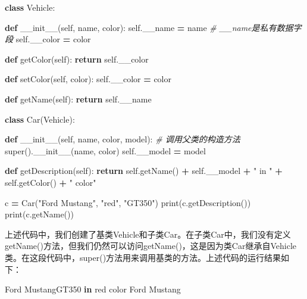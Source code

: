 \documentclass[]{ctexbook}
\newenvironment{Shaded}{\begin{snugshade}}{\end{snugshade}}
\newcommand{\BuiltInTok}[1]{#1}
\newcommand{\CommentTok}[1]{\textcolor[rgb]{0.56,0.35,0.01}{\textit{#1}}}
\newcommand{\ControlFlowTok}[1]{\textcolor[rgb]{0.13,0.29,0.53}{\textbf{#1}}}
\newcommand{\FunctionTok}[1]{\textcolor[rgb]{0.00,0.00,0.00}{#1}}
\newcommand{\KeywordTok}[1]{\textcolor[rgb]{0.13,0.29,0.53}{\textbf{#1}}}
\newcommand{\NormalTok}[1]{#1}
\newcommand{\OperatorTok}[1]{\textcolor[rgb]{0.81,0.36,0.00}{\textbf{#1}}}
\newcommand{\StringTok}[1]{\textcolor[rgb]{0.31,0.60,0.02}{#1}}
\newcommand{\VariableTok}[1]{\textcolor[rgb]{0.00,0.00,0.00}{#1}}
\begin{document}
\begin{Shaded}
\begin{Highlighting}[]
\KeywordTok{class}\NormalTok{ Vehicle:}

    \KeywordTok{def} \FunctionTok{__init__}\NormalTok{(}\VariableTok{self}\NormalTok{, name, color):}
        \VariableTok{self}\NormalTok{.__name }\OperatorTok{=}\NormalTok{ name      }\CommentTok{# __name是私有数据字段}
        \VariableTok{self}\NormalTok{.__color }\OperatorTok{=}\NormalTok{ color}

    \KeywordTok{def}\NormalTok{ getColor(}\VariableTok{self}\NormalTok{):}
        \ControlFlowTok{return} \VariableTok{self}\NormalTok{.__color}

    \KeywordTok{def}\NormalTok{ setColor(}\VariableTok{self}\NormalTok{, color):}
        \VariableTok{self}\NormalTok{.__color }\OperatorTok{=}\NormalTok{ color}

    \KeywordTok{def}\NormalTok{ getName(}\VariableTok{self}\NormalTok{):}
        \ControlFlowTok{return} \VariableTok{self}\NormalTok{.__name}

\KeywordTok{class}\NormalTok{ Car(Vehicle):}

    \KeywordTok{def} \FunctionTok{__init__}\NormalTok{(}\VariableTok{self}\NormalTok{, name, color, model):}
        \CommentTok{# 调用父类的构造方法}
        \BuiltInTok{super}\NormalTok{().}\FunctionTok{__init__}\NormalTok{(name, color)}
        \VariableTok{self}\NormalTok{.__model }\OperatorTok{=}\NormalTok{ model}

    \KeywordTok{def}\NormalTok{ getDescription(}\VariableTok{self}\NormalTok{):}
        \ControlFlowTok{return} \VariableTok{self}\NormalTok{.getName() }\OperatorTok{+} \VariableTok{self}\NormalTok{.__model }\OperatorTok{+} \StringTok{" in "} \OperatorTok{+} \VariableTok{self}\NormalTok{.getColor() }\OperatorTok{+} \StringTok{" color"}

\NormalTok{c }\OperatorTok{=}\NormalTok{ Car(}\StringTok{"Ford Mustang"}\NormalTok{, }\StringTok{"red"}\NormalTok{, }\StringTok{"GT350"}\NormalTok{)}
\BuiltInTok{print}\NormalTok{(c.getDescription())}
\BuiltInTok{print}\NormalTok{(c.getName())}
\end{Highlighting}
\end{Shaded}

上述代码中，我们创建了基类Vehicle和子类Car。在子类Car中，我们没有定义getName()方法，但我们仍然可以访问getName()，这是因为类Car继承自Vehicle类。在这段代码中，super()方法用来调用基类的方法。上述代码的运行结果如下：

\begin{Shaded}
\begin{Highlighting}[]
\NormalTok{Ford MustangGT350 }\KeywordTok{in}\NormalTok{ red color}
\NormalTok{Ford Mustang}
\end{Highlighting}
\end{Shaded}
\end{document}
